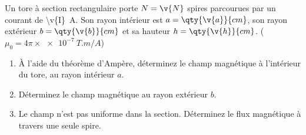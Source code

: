 Un tore à section rectangulaire porte $N = \v{N}$ spires parcourues par un courant de \qty{\v{I}}{A}. Son rayon intérieur est $a = \qty{\v{a}}{cm}$, son rayon extérieur $b = \qty{\v{b}}{cm}$ et sa hauteur $h = \qty{\v{h}}{cm}$. ($\mu_0 = 4\pi \times \qty{e-7}{T.m/A}$)

\begin{enumerate}[label=\alph*)]
    \item À l'aide du théorème d'Ampère, déterminez le champ magnétique à l'intérieur du tore, au rayon intérieur $a$.
    \item Déterminez le champ magnétique au rayon extérieur $b$.
    \item Le champ n'est pas uniforme dans la section. Déterminez le flux magnétique à travers une seule spire.
\end{enumerate}
